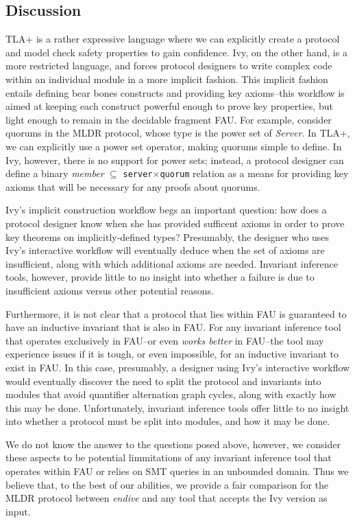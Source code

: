 \documentclass[runningheads]{llncs}
\newcommand{\ivy}[1]{{\texttt{#1}}}
\begin{document}
\subsection{Discussion}

TLA+ is a rather expressive language where we can explicitly create a protocol and model check safety properties to gain confidence.  Ivy, on the other hand, is a more restricted language, and forces protocol designers to write complex code within an individual module in a more implicit fashion.  This implicit fashion entails defining bear bones constructs and providing key axioms--this workflow is aimed at keeping each construct powerful enough to prove key properties, but light enough to remain in the decidable fragment FAU.  For example, consider quorums in the MLDR protocol, whose type is the power set of \textit{Server}.  In TLA+, we can explicitly use a power set operator, making quorums simple to define.  In Ivy, however, there is no support for power sets; instead, a protocol designer can define a binary \textit{member} ${\scriptstyle\subseteq}$ \ivy{server}$\times$\ivy{quorum} relation as a means for providing key axioms that will be necessary for any proofs about quorums.

Ivy's implicit construction workflow begs an important question: how does a protocol designer know when she has provided sufficent axioms in order to prove key theorems on implicitly-defined types?  Presumably, the designer who uses Ivy's interactive workflow will eventually deduce when the set of axioms are insufficient, along with which additional axioms are needed.  Invariant inference tools, however,  provide little to no insight into whether a failure is due to insufficient axioms versus other potential reasons.

Furthermore, it is not clear that a protocol that lies within FAU is guaranteed to have an inductive invariant that is also in FAU.  For any invariant inference tool that operates exclusively in FAU--or even \textit{works better} in FAU--the tool may experience issues if it is tough, or even impossible, for an inductive invariant to exist in FAU.  In this case, presumably, a designer using Ivy's interactive workflow would eventually discover the need to split the protocol and invariants into modules that avoid quantifier alternation graph cycles, along with exactly how this may be done.  Unfortunately, invariant inference tools offer little to no insight into whether a protocol must be split into modules, and how it may be done.

We do not know the answer to the questions posed above, however, we consider these aspects to be potential limmitations of any invariant inference tool that operates within FAU or relies on SMT queries in an unbounded domain.  Thus we believe that, to the best of our abilities, we provide a fair comparison for the MLDR protocol between \textit{endive} and any tool that accepts the Ivy version as input.





\end{document}
